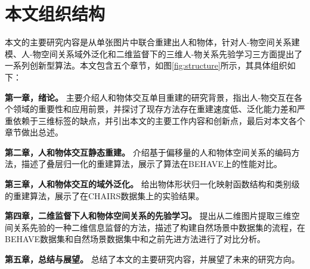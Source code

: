 \section{本文组织结构}

本文的主要研究内容是从单张图片中联合重建出人和物体，针对人-物空间关系建模、人-物空间关系域外泛化和二维监督下的三维人-物关系先验学习三方面提出了一系列创新型算法。本文包含五个章节，如图\ref{fig:structure}所示，其具体组织如下：

\textbf{第一章，绪论。} 主要介绍人和物体交互单目重建的研究背景，指出人-物交互在各个领域的重要性和应用前景，并探讨了现存方法存在重建速度低、泛化能力差和严重依赖于三维标签的缺点，并引出本文的主要工作内容和创新点，最后对本文各个章节做出总述。

\textbf{第二章，人和物体交互静态重建。} 介绍基于偏移量的人和物体空间关系的编码方法，描述了叠层归一化的重建算法，展示了算法在BEHAVE上的性能对比。

\textbf{第三章，人和物体交互的域外泛化。} 给出物体形状归一化映射函数结构和类别级的重建算法，展示了在CHAIRS数据集上的实验结果。

\textbf{第四章，二维监督下人和物体空间关系的先验学习。} 提出从二维图片提取三维空间关系先验的一种二维信息监督的方法，描述了构建自然场景中数据集的流程，在BEHAVE数据集和自然场景数据集中和之前先进方法进行了对比分析。


\textbf{第五章，总结与展望。} 总结了本文的主要研究内容，并展望了未来的研究方向。






